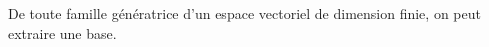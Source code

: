 De toute famille génératrice d'un espace vectoriel de dimension finie, on peut extraire une base.

\begin{reponses}
\end{reponses}

